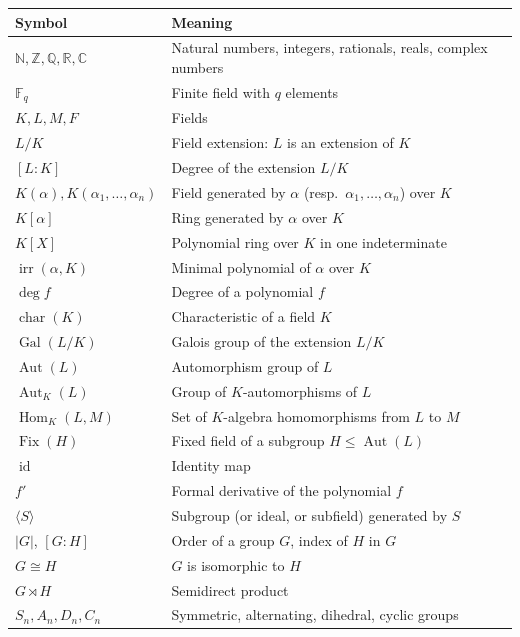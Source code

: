 \documentclass[12pt,a4paper,openany]{book}
\theoremstyle{definition}
\theoremstyle{remark}
\newcommand{\N}{\mathbb{N}}
\newcommand{\Z}{\mathbb{Z}}
\newcommand{\Q}{\mathbb{Q}}
\newcommand{\R}{\mathbb{R}}
\newcommand{\C}{\mathbb{C}}
\newcommand{\F}{\mathbb{F}}
\DeclareMathOperator{\Gal}{Gal}
\DeclareMathOperator{\Aut}{Aut}
\DeclareMathOperator{\Hom}{Hom}
\DeclareMathOperator{\id}{id}
\DeclareMathOperator{\chr}{char}
\renewcommand{\deg}{\operatorname{deg}}
\DeclareMathOperator{\irr}{irr}
\DeclareMathOperator{\Fix}{Fix}
\begin{document}
\begin{center}
\renewcommand{\arraystretch}{1.4}
\begin{tabular}{@{} l p{10cm} @{}}
\toprule
\textbf{Symbol} & \textbf{Meaning} \\
\midrule
$\N, \Z, \Q, \R, \C$ & Natural numbers, integers, rationals, reals,
  complex numbers \\
$\F_q$ & Finite field with $q$ elements \\
$K, L, M, F$ & Fields \\
$L/K$ & Field extension: $L$ is an extension of $K$ \\
$[L:K]$ & Degree of the extension $L/K$ \\
$K(\alpha), K(\alpha_1,\dots,\alpha_n)$ & Field generated by
  $\alpha$ (resp.\ $\alpha_1,\dots,\alpha_n$) over $K$ \\
$K[\alpha]$ & Ring generated by $\alpha$ over $K$ \\
$K[X]$ & Polynomial ring over $K$ in one indeterminate \\
$\irr(\alpha,K)$ & Minimal polynomial of $\alpha$ over $K$ \\
$\deg f$ & Degree of a polynomial $f$ \\
$\chr(K)$ & Characteristic of a field $K$ \\
$\Gal(L/K)$ & Galois group of the extension $L/K$ \\
$\Aut(L)$ & Automorphism group of $L$ \\
$\Aut_K(L)$ & Group of $K$-automorphisms of $L$ \\
$\Hom_K(L,M)$ & Set of $K$-algebra homomorphisms from $L$ to $M$ \\
$\Fix(H)$ & Fixed field of a subgroup $H \le \Aut(L)$ \\
$\id$ & Identity map \\
$f'$ & Formal derivative of the polynomial $f$ \\
$\langle S \rangle$ & Subgroup (or ideal, or subfield) generated by
  $S$ \\
$|G|$, $[G:H]$ & Order of a group $G$, index of $H$ in $G$ \\
$G \cong H$ & $G$ is isomorphic to $H$ \\
$G \rtimes H$ & Semidirect product \\
$S_n, A_n, D_n, C_n$ & Symmetric, alternating, dihedral, cyclic groups \\
\bottomrule
\end{tabular}
\end{center}
\end{document}
